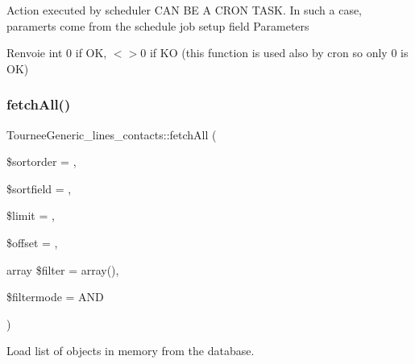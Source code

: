 Action executed by scheduler C\+AN BE A C\+R\+ON T\+A\+SK. In such a case, paramerts come from the schedule job setup field \textquotesingle{}Parameters\textquotesingle{}

\begin{DoxyReturn}{Renvoie}
int 0 if OK, $<$$>$0 if KO (this function is used also by cron so only 0 is OK) 
\end{DoxyReturn}
\mbox{\label{classTourneeGeneric__lines__contacts_ab3c5519a2a6e58620d8b0cbbfbd70a16}} 
\subsubsection{\texorpdfstring{fetch\+All()}{fetchAll()}}
{\footnotesize\ttfamily Tournee\+Generic\+\_\+lines\+\_\+contacts\+::fetch\+All (\begin{DoxyParamCaption}\item[{}]{\$sortorder = {\ttfamily \textquotesingle{}\textquotesingle{}},  }\item[{}]{\$sortfield = {\ttfamily \textquotesingle{}\textquotesingle{}},  }\item[{}]{\$limit = {},  }\item[{}]{\$offset = {},  }\item[{array}]{\$filter = {\ttfamily array()},  }\item[{}]{\$filtermode = {\ttfamily \textquotesingle{}AND\textquotesingle{}} }\end{DoxyParamCaption})}

Load list of objects in memory from the database.


